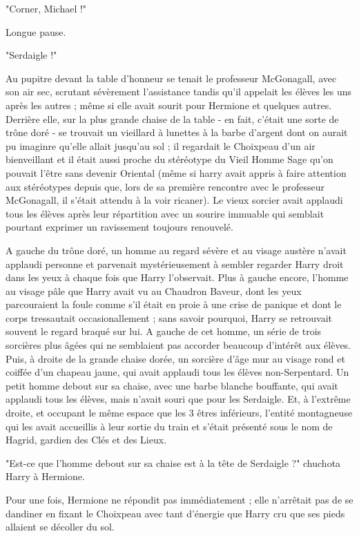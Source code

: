 "Corner, Michael !"

Longue pause.

"Serdaigle !"

Au pupitre devant la table d'honneur se tenait le professeur McGonagall, avec son air sec, scrutant sévèrement l'assistance tandis qu'il appelait les élèves les uns après les autres ; même si elle avait sourit pour Hermione et quelques autres. Derrière elle, sur la plus grande chaise de la table - en fait, c'était une sorte de trône doré - se trouvait un vieillard à lunettes à la barbe d'argent dont on aurait pu imaginre qu'elle allait jusqu'au sol ; il regardait le Choixpeau d'un air bienveillant et il était aussi proche du stéréotype du Vieil Homme Sage qu'on pouvait l'être sans devenir Oriental (même si harry avait appris à faire attention aux stéréotypes depuis que, lors de sa première rencontre avec le professeur McGonagall, il s'était attendu à la voir ricaner). Le vieux sorcier avait applaudi tous les élèves après leur répartition avec un sourire immuable qui semblait pourtant exprimer un ravissement toujours renouvelé.

A gauche du trône doré, un homme au regard sévère et au visage austère n'avait applaudi personne et parvenait mystérieusement à sembler regarder Harry droit dans les yeux à chaque fois que Harry l'observait. Plus à gauche encore, l'homme au visage pâle que Harry avait vu au Chaudron Baveur, dont les yeux parcouraient la foule comme s'il était en proie à une crise de panique et dont le corps tressautait occasionallement ; sans savoir pourquoi, Harry se retrouvait souvent le regard braqué sur lui. A gauche de cet homme, un série de trois sorcières plus âgées qui ne semblaient pas accorder beaucoup d'intérêt aux élèves. Puis, à droite de la grande chaise dorée, un sorcière d'âge mur au visage rond et coiffée d'un chapeau jaune, qui avait applaudi tous les élèves non-Serpentard. Un petit homme debout sur sa chaise, avec une barbe blanche bouffante, qui avait applaudi tous les élèves, mais n'avait souri que pour les Serdaigle. Et, à l'extrême droite, et occupant le même espace que les 3 êtres inférieurs, l'entité montagneuse qui les avait accueillis à leur sortie du train et s'était présenté sous le nom de Hagrid, gardien des Clés et des Lieux.

"Est-ce que l'homme debout sur sa chaise est à la tête de Serdaigle ?" chuchota Harry à Hermione.

Pour une fois, Hermione ne répondit pas immédiatement ; elle n'arrêtait pas de se dandiner en fixant le Choixpeau avec tant d'énergie que Harry cru que ses pieds allaient se décoller du sol.

